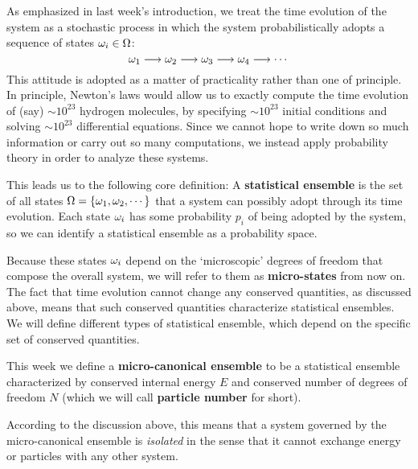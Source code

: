As emphasized in last week's introduction, we treat the time evolution of the system as a stochastic process in which the system probabilistically adopts a sequence of states $\omega_i \in \Omega$:
\begin{equation*}
  \omega_1 \longrightarrow \omega_2 \longrightarrow \omega_3 \longrightarrow \omega_4 \longrightarrow \cdots
\end{equation*}
This attitude is adopted as a matter of practicality rather than one of principle.
In principle, Newton's laws would allow us to exactly compute the time evolution of (say) $\sim$$10^{23}$ hydrogen molecules, by specifying $\sim$$10^{23}$ initial conditions and solving $\sim$$10^{23}$ differential equations.
Since we cannot hope to write down so much information or carry out so many computations, we instead apply probability theory in order to analyze these systems.

\begin{shaded}
  This leads us to the following core definition: A \textbf{statistical ensemble} is the set of all states $\Omega = \left\{\omega_1, \omega_2, \cdots\right\}$ that a system can possibly adopt through its time evolution.
  Each state $\omega_i$ has some probability $p_i$ of being adopted by the system, so we can identify a statistical ensemble as a probability space.
\end{shaded}

Because these states $\omega_i$ depend on the `microscopic' degrees of freedom that compose the overall system, we will refer to them as \textbf{micro-states} from now on.
The fact that time evolution cannot change any conserved quantities, as discussed above, means that such conserved quantities characterize statistical ensembles.
We will define different types of statistical ensemble, which depend on the specific set of conserved quantities.

\begin{shaded}
  This week we define a \textbf{micro-canonical ensemble} to be a statistical ensemble characterized by conserved internal energy $E$ and conserved number of degrees of freedom $N$ (which we will call \textbf{particle number} for short).
\end{shaded}

According to the discussion above, this means that a system governed by the micro-canonical ensemble is \textit{isolated} in the sense that it cannot exchange energy or particles with any other system.





